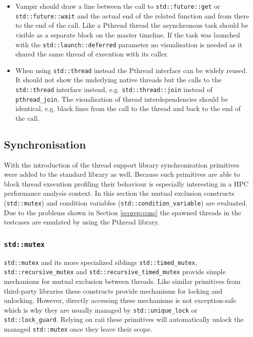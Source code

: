 \begin{itemize}
\item Vampir should draw a line between the call to \texttt{std::future::get} or \texttt{std::future::wait} and the actual end of the related function and from there to the end of the call. Like a Pthread thread the asynchronous task should be visible as a separate block on the master timeline. If the task was launched with the \texttt{std::launch::deferred} parameter no visualisation is needed as it shared the same thread of execution with its caller.
\item When using \texttt{std::thread} instead the Pthread interface can be widely reused. It should not show the underlying native threads but the calls to the \texttt{std::thread} interface instead, e.g. \texttt{std::thread::join} instead of \texttt{pthread\_join}. The visualisation of thread interdependencies should be identical, e.g. black lines from the call to the thread and back to the end of the call.
\end{itemize}

\subsection{Synchronisation}

With the introduction of the thread support library synchronisation primitives were added to the standard library as well. Because such primitives are able to block thread execution profiling their behaviour is especially interesting in a HPC performance analysis context. In this section the mutual exclusion constructs (\texttt{std::mutex}) and condition variables (\texttt{std::condition\_variable}) are evaluated. Due to the problems shown in Section \ref{scorep:conc} the spawned threads in the testcases are emulated by using the Pthread library.

\subsubsection{\texttt{std::mutex}}\label{scorep:sync:mutex}

\texttt{std::mutex} and its more specialized siblings \texttt{std::timed\_mutex}, \texttt{std::recursive\_mutex} and \texttt{std::recursive\_timed\_mutex} provide simple mechanisms for mutual exclusion between threads. Like similar primitives from third-party libraries these constructs provide mechanisms for locking and unlocking. However, directly accessing these mechanisms is not exception-safe which is why they are usually managed by \texttt{std::unique\_lock} or \texttt{std::lock\_guard}. Relying on \gls{raii} these primitives will automatically unlock the managed \texttt{std::mutex} once they leave their scope.

